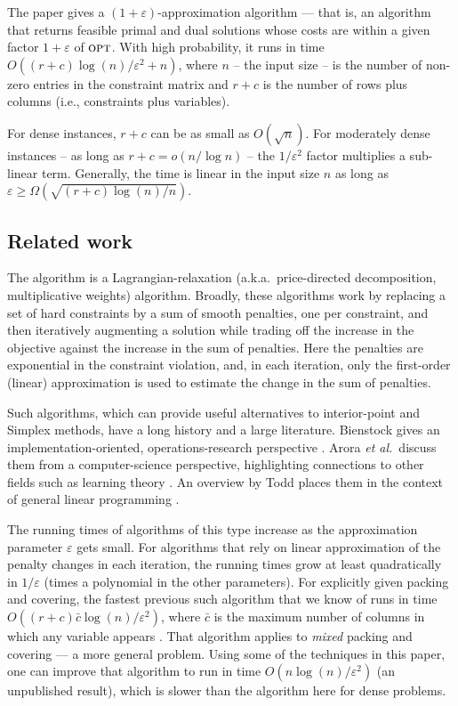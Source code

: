 \documentclass[11pt]{svjour3} \usepackage{fullpage}
\newcommand{\eps}{\varepsilon}
\newcommand{\opt}{\mbox{{\sc opt}}}
\newcommand{\rows}{r}
\newcommand{\columns}{c}
\newcommand{\inputsize}{n}
\begin{document}
The paper gives a $(1+\eps)$-approximation algorithm ---
that is, an algorithm that returns feasible primal and dual solutions whose costs are within a given factor $1+\eps$ of $\opt$.
With high probability, it runs in time
$O((\rows+\columns)\log(\inputsize)/\eps^2 + \inputsize)$, where $\inputsize$ -- the input size -- is the number of non-zero entries in the constraint matrix and $\rows+\columns$ is the number of rows plus columns (i.e., constraints plus variables).  

For dense instances, $r+c$ can be as small as $O(\sqrt\inputsize)$.
For moderately dense instances -- as long as $r+c = o(n/\log n)$ --
the $1/\eps^2$ factor multiplies a sub-linear term.
Generally, the time is linear in the input size $n$ as long as $\eps \ge \Omega(\sqrt{(\rows+\columns)\log(\inputsize)/\inputsize})$.

\subsection{Related work}
The algorithm is a Lagrangian-relaxation (a.k.a.~price-directed decomposition, multiplicative weights) algorithm.
Broadly, these algorithms work by replacing a set of hard constraints by a sum of smooth penalties, one per constraint, and then iteratively augmenting a solution while trading off the increase in the objective against the increase in the sum of penalties.
Here the penalties are exponential in the constraint violation,
and, in each iteration, only the first-order (linear) approximation 
is used to estimate the change in the sum of penalties.

Such algorithms, which can provide useful alternatives to interior-point and Simplex methods,  have a long history and a large literature.
Bienstock gives an implementation-oriented, operations-research perspective \cite{Bienstock00Potential}.  
Arora {\em et al.}\ discuss them from a computer-science perspective, highlighting connections to other fields such as learning theory \cite{arora2012multiplicative}.
An overview by Todd places them in the context of general linear programming \cite{todd2002mfl}.

The running times of algorithms of this type increase as the approximation parameter $\eps$ gets small.   For algorithms that rely on linear approximation of the penalty changes in each iteration, the running times grow at least quadratically in $1/\eps$ (times a polynomial in the other parameters).  For explicitly given packing and covering, the fastest previous such algorithm that we know of runs in time $O((\rows+\columns)\bar{\columns}\log(\inputsize)/\eps^2)$, where $\bar{\columns}$ is the maximum number of columns in which any variable appears \cite{Young01Sequential}.  
That algorithm applies to {\em mixed} packing and covering --- a more general problem.
Using some of the techniques in this paper, one can improve that algorithm to run in time $O(\inputsize\log(\inputsize)/\eps^2)$ (an unpublished result),
which is slower than the algorithm here for dense problems.
\end{document}
